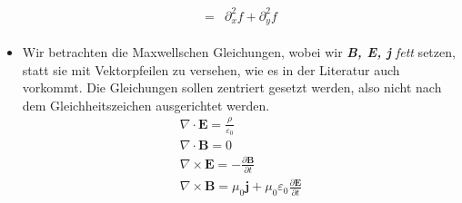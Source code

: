 \documentclass[11pt,a4paper]{scrartcl} %
\newcommand{\p}{\partial}
\begin{document}
\begin{itemize}
\begin{align}
\begin{split}
= & \p_x^2 f + \p_y^2 f
\end{split}
\end{align}
\item Wir betrachten die Maxwellschen Gleichungen, wobei wir \textit{ \textbf{B, E, j} fett} setzen, statt sie mit Vektorpfeilen zu versehen, wie es in der Literatur auch vorkommt. Die Gleichungen sollen zentriert gesetzt werden, also nicht nach dem Gleichheitszeichen ausgerichtet werden.
\begin{gather*}
\nabla \cdot \textbf{E} = \frac{\rho}{\varepsilon_0} \\
\nabla \cdot \textbf{B} = 0 \\
\nabla \times \textbf{E} = - \frac{\p \textbf{B}}{\p t} \\
\nabla \times \textbf{B} = \mu_0 \textbf{j} + \mu_0 \varepsilon_0 \frac{\p \textbf{E}}{\p t} \\
\end{gather*}
\end{itemize}
\end{document}
